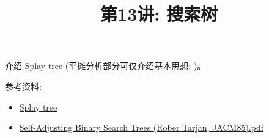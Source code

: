 \documentclass[a4paper, justified]{tufte-handout}
\title{第13讲: 搜索树}
\date{\zhtoday} %
\begin{document}
\maketitle
\noplagiarism %
\begin{abstract}
\end{abstract}
\beginrequired

\begin{problem}[TC 12.1-5]
\end{problem}

\begin{solution}
\end{solution}

\begin{problem}[TC 12.2-9]
\end{problem}

\begin{solution}
\end{solution}

\begin{problem}[TC 12.3-5]
\end{problem}

\begin{solution}
\end{solution}

\beginoptional

\begin{problem}[]
\end{problem}

\begin{solution}
\end{solution}

\beginot

\begin{ot}
  介绍 Splay tree (平摊分析部分可仅介绍基本思想; )。

  \noindent 参考资料:
  \begin{itemize}
    \item \href{https://en.wikipedia.org/wiki/Splay\_tree}{Splay tree}
    \item \href{https://www.cs.princeton.edu/courses/archive/spring06/cos423/Handouts/self\%20adjusting.pdf}{Self-Adjusting Binary Search Trees (Rober Tarjan, JACM85).pdf}
  \end{itemize}
\end{ot}
\end{document}
